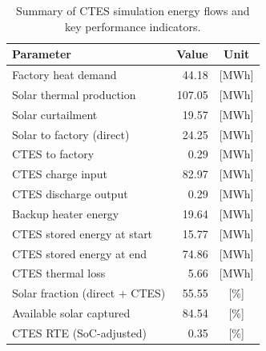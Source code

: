 \renewcommand{\arraystretch}{1.2}
\begin{table}[h]
\centering
\begin{tabular}{l|r c}
\hline
Parameter & Value & Unit \\
\hline
Factory heat demand & 44.18 & [MWh] \\
Solar thermal production & 107.05 & [MWh] \\
Solar curtailment & 19.57 & [MWh] \\
Solar to factory (direct) & 24.25 & [MWh] \\
CTES to factory & 0.29 & [MWh] \\
CTES charge input & 82.97 & [MWh] \\
CTES discharge output & 0.29 & [MWh] \\
Backup heater energy & 19.64 & [MWh] \\
CTES stored energy at start & 15.77 & [MWh] \\
CTES stored energy at end & 74.86 & [MWh] \\
CTES thermal loss & 5.66 & [MWh] \\
\hline
Solar fraction (direct + CTES) & 55.55 & [\%] \\
Available solar captured & 84.54 & [\%] \\
CTES RTE (SoC-adjusted) & 0.35 & [\%] \\
\hline
\end{tabular}
\caption{Summary of CTES simulation energy flows and key performance indicators.}
\label{tab:ctes-simulation-summary}
\end{table}
